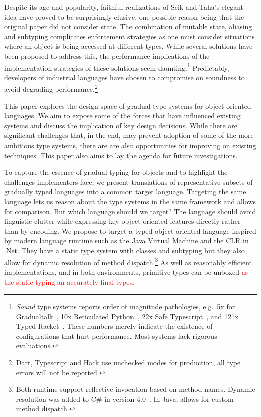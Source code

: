 \documentclass[a4paper,USenglish]{tex/lipics-v2016}
\begin{document}
Despite its age and popularity, faithful realizations of Seik and Taha's
elegant idea have proved to be surprisingly elusive, one possible reason
being that the original paper did not consider state. The combination of
mutable state, aliasing and subtyping complicates enforcement strategies as
one must consider situations where an object is being accessed at different
types. While several solutions have been proposed to address this, the
performance implications of the implementation strategies of these solutions
seem daunting.\footnote{\emph{Sound} type systems reports order of magnitude
  pathologies, e.g.~5x for Gradualtalk~\cite{allende13}, 10x Reticulated
  Python~\cite{siek14}, 22x Safe Typescript~\cite{safe-typescript}, and 121x
  Typed Racket~\cite{popl16}. These numbers merely indicate the existence of
  configurations that hurt performance.  Most systems lack rigorous
  evaluations. } Predictably, developers of industrial languages have chosen
to compromise on soundness to avoid degrading performance.\footnote{Dart,
  Typescript and Hack use unchecked modes for production, all type errors
  will not be reported.}

This paper explores the design space of gradual type systems for object-oriented
languages. We aim to expose some of the forces that have influenced existing
systems and discuss the implication of key design decisions. While there are
significant challenges that, in the end, may prevent adoption of some of the
more ambitious type systems, there are are also opportunities for improving on
existing techniques.  This paper also aims to lay the agenda for future
investigations.

To capture the essence of gradual typing for objects and to highlight the
challenges implementers face, we present translations of representative subsets
of gradually typed languages into a common target language. Targeting the same
language lets us reason about the type systems in the same framework and allows
for comparison. But which language should we target? The language should avoid
linguistic clutter while expressing key object-oriented features directly rather
than by encoding. We propose to target a typed object-oriented language
inspired by modern language runtime such as the Java Virtual Machine and the
CLR in .Net. They have a static type system with classes and subtyping but they
also allow for dynamic resolution of method dispatch.\footnote{Both runtime
support reflective invocation based on method names. Dynamic resolution was
added to C\# in version 4.0~\cite{BAT14}. In Java,  allows for
custom method dispatch.} As well as reasonably efficient implementations, and in
both environments, primitive types can be unboxed \textcolor{red}{as the static typing an
accurately final types}.
\end{document}
